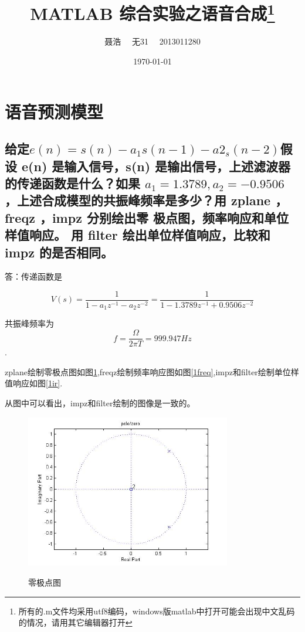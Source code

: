 \documentclass{ctexart}
\title{MATLAB 综合实验之语音合成\footnote{所有的.m文件均采用utf8编码，windows版matlab中打开可能会出现中文乱码的情况，请用其它编辑器打开}}
\author{聂浩~~ 无31~~ 2013011280}
\date{\today}
\begin{document}
\maketitle
\section{语音预测模型}
\subsection{
    给定$e(n) = s(n)-a_1s(n-1)-a2_s(n-2)$假设 e(n) 是输入信号，s(n)
    是输出信号，上述滤波器的传递函数是什么？如果 $a_1 = 1.3789,
    a_2 =-0.9506$ ，上述合成模型的共振峰频率是多少？用 zplane ，
    freqz ，impz 分别绘出零 极点图，频率响应和单位样值响应。
用 filter 绘出单位样值响应，比较和 impz 的是否相同。}

答：传递函数是

\[V(s)=\frac{1}{1-a_1z^{-1}-a_2z^{-2}}=\frac{1}{1-1.3789z^{-1}+0.9506z^{-2}}\]

共振峰频率为\[f=\frac{\Omega}{2\pi T}=999.947Hz\].

zplane绘制零极点图如图\ref{1zp},freqz绘制频率响应图如图\ref{1freq},impz和filter绘制单位样值响应如图\ref{1ir}.

从图中可以看出，impz和filter绘制的图像是一致的。

\begin{figure}
    \centering
    \includegraphics[width=0.8\textwidth]{1_zp.jpg}\\
    \caption{零极点图\label{1zp}}
\end{figure}
\end{document}
